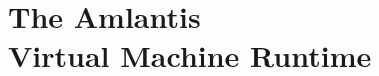 
\part[The Amlantis Virtual Machine Runtime]{The Amlantis \\Virtual Machine Runtime}
\label{part:runtime}

